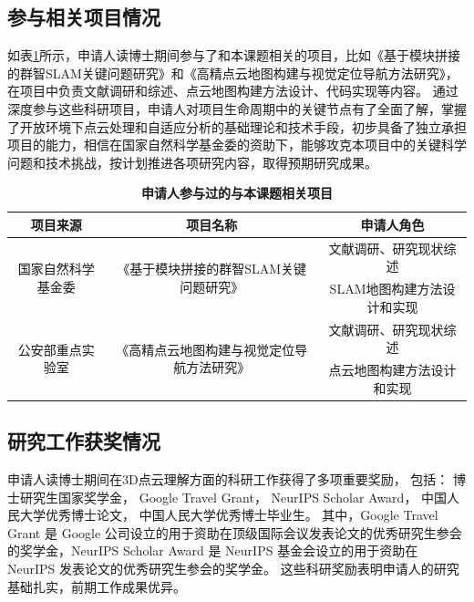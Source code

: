 \documentclass[12pt]{article}
\begin{document}
\subsection{参与相关项目情况}

如表\ref{tab:related_projects}所示，申请人读博士期间参与了和本课题相关的项目，比如《基于模块拼接的群智SLAM关键问题研究》和《高精点云地图构建与视觉定位导航方法研究》，在项目中负责文献调研和综述、点云地图构建方法设计、代码实现等内容。
通过深度参与这些科研项目，申请人对项目生命周期中的关键节点有了全面了解，掌握了开放环境下点云处理和自适应分析的基础理论和技术手段，初步具备了独立承担项目的能力，相信在国家自然科学基金委的资助下，能够攻克本项目中的关键科学问题和技术挑战，按计划推进各项研究内容，取得预期研究成果。

\begin{table}[ht]
   \centering
   \caption{\textbf{申请人参与过的与本课题相关项目}}
   \scriptsize
   \begin{tabular}{c c c}
    \toprule
      \textbf{项目来源} & \textbf{项目名称} & \textbf{申请人角色} \\
      \midrule
      \multirow{2}{*}{国家自然科学基金委} & \multirow{2}{*}{《基于模块拼接的群智SLAM关键问题研究》} & 文献调研、研究现状综述 \\
      & & SLAM地图构建方法设计和实现 \\
      \midrule
      \multirow{2}{*}{公安部重点实验室} & \multirow{2}{*}{《高精点云地图构建与视觉定位导航方法研究》} & 文献调研、研究现状综述 \\
      & & 点云地图构建方法设计和实现 \\
      \bottomrule
    \end{tabular}
    \label{tab:related_projects}
\end{table}

\subsection{研究工作获奖情况}

申请人读博士期间在3D点云理解方面的科研工作获得了多项重要奖励，
包括：
博士研究生国家奖学金，
Google Travel Grant，
NeurIPS Scholar Award，
中国人民大学优秀博士论文，
中国人民大学优秀博士毕业生。
其中，Google Travel Grant 是 Google 公司设立的用于资助在顶级国际会议发表论文的优秀研究生参会的奖学金，NeurIPS Scholar Award 是 NeurIPS 基金会设立的用于资助在 NeurIPS 发表论文的优秀研究生参会的奖学金。
这些科研奖励表明申请人的研究基础扎实，前期工作成果优异。
\end{document}

